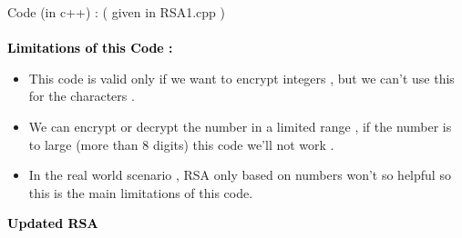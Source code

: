 \documentclass{article}
\begin{document}
Code (in c++) : ( given in RSA1.cpp )\\\\
\centering\textbf{{\LARGE \bf \textcolor{black}{Limitations of this Code :}\\}}
\vspace{1cm}
\begin{tcolorbox}



\begin{itemize}
\item This code is valid only if we want to encrypt integers , but we can't use this for the characters .
\end{itemize}

\begin{itemize}
\item We can encrypt or decrypt the number in a limited range , if the number is to large (more than 8 digits) this code we'll not work .
\end{itemize}

\begin{itemize}
\item In the real world scenario , RSA only based on numbers won't so helpful so this is the main limitations of this code.\\
\end{itemize}

  \end{tcolorbox}
\pagebreak
\centering\textbf{{\LARGE \bf \textcolor{black}{Updated RSA}\\}}
\vspace{1cm}
\end{document}
